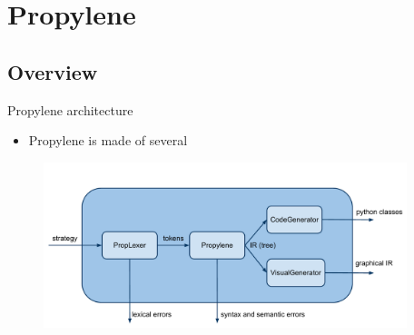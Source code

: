 \section{Propylene}
\subsection{Overview}
\begin{frame}{Propylene architecture}
  \begin{itemize}
  \item Propylene is made of several 
  \end{itemize}
  \begin{figure}[!h]
    \begin{center}
      \includegraphics[width=300pt]{img/propylene.pdf}
    \end{center}
  \end{figure}
\end{frame}
